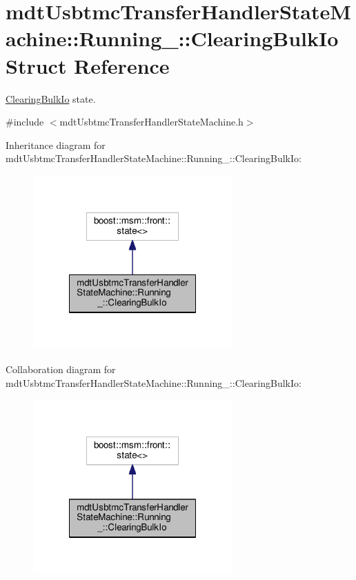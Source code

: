 \hypertarget{structmdt_usbtmc_transfer_handler_state_machine_1_1_running___1_1_clearing_bulk_io}{\section{mdt\-Usbtmc\-Transfer\-Handler\-State\-Machine\-:\-:Running\-\_\-\-:\-:Clearing\-Bulk\-Io Struct Reference}
\label{structmdt_usbtmc_transfer_handler_state_machine_1_1_running___1_1_clearing_bulk_io}
}


\hyperlink{structmdt_usbtmc_transfer_handler_state_machine_1_1_running___1_1_clearing_bulk_io}{Clearing\-Bulk\-Io} state.  




{\ttfamily \#include $<$mdt\-Usbtmc\-Transfer\-Handler\-State\-Machine.\-h$>$}



Inheritance diagram for mdt\-Usbtmc\-Transfer\-Handler\-State\-Machine\-:\-:Running\-\_\-\-:\-:Clearing\-Bulk\-Io\-:\nopagebreak
\begin{figure}[H]
\begin{center}
\leavevmode
\includegraphics[width=216pt]{structmdt_usbtmc_transfer_handler_state_machine_1_1_running___1_1_clearing_bulk_io__inherit__graph}
\end{center}
\end{figure}


Collaboration diagram for mdt\-Usbtmc\-Transfer\-Handler\-State\-Machine\-:\-:Running\-\_\-\-:\-:Clearing\-Bulk\-Io\-:\nopagebreak
\begin{figure}[H]
\begin{center}
\leavevmode
\includegraphics[width=216pt]{structmdt_usbtmc_transfer_handler_state_machine_1_1_running___1_1_clearing_bulk_io__coll__graph}
\end{center}
\end{figure}
